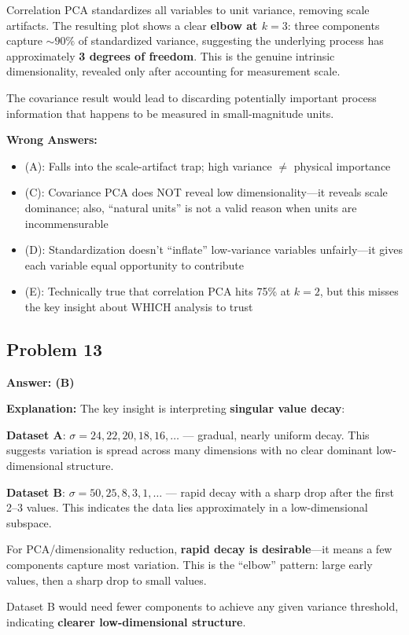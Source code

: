 \documentclass[12pt]{amsart}
\newcommand{\correct}[1]{{\color{correctgreen}\textbf{#1}}}
\begin{document}
\begin{itemize}
Correlation PCA standardizes all variables to unit variance, removing scale artifacts. The resulting plot shows a clear \textbf{elbow at $k=3$}: three components capture $\sim 90\%$ of standardized variance, suggesting the underlying process has approximately \textbf{3 degrees of freedom}. This is the genuine intrinsic dimensionality, revealed only after accounting for measurement scale.

The covariance result would lead to discarding potentially important process information that happens to be measured in small-magnitude units.

\textbf{Wrong Answers:}
\begin{itemize}
\item (A): Falls into the scale-artifact trap; high variance $\neq$ physical importance
\item (C): Covariance PCA does NOT reveal low dimensionality---it reveals scale dominance; also, ``natural units'' is not a valid reason when units are incommensurable
\item (D): Standardization doesn't ``inflate'' low-variance variables unfairly---it gives each variable equal opportunity to contribute
\item (E): Technically true that correlation PCA hits 75\% at $k=2$, but this misses the key insight about WHICH analysis to trust
\end{itemize}

\subsection*{Problem 13}
\correct{Answer: (B)}

\textbf{Explanation:} The key insight is interpreting \textbf{singular value decay}:

\textbf{Dataset A}: $\sigma = 24, 22, 20, 18, 16, \ldots$ --- gradual, nearly uniform decay. This suggests variation is spread across many dimensions with no clear dominant low-dimensional structure.

\textbf{Dataset B}: $\sigma = 50, 25, 8, 3, 1, \ldots$ --- rapid decay with a sharp drop after the first 2--3 values. This indicates the data lies approximately in a low-dimensional subspace.

For PCA/dimensionality reduction, \textbf{rapid decay is desirable}---it means a few components capture most variation. This is the ``elbow'' pattern: large early values, then a sharp drop to small values.

Dataset B would need fewer components to achieve any given variance threshold, indicating \textbf{clearer low-dimensional structure}.


\end{itemize}
\end{document}
